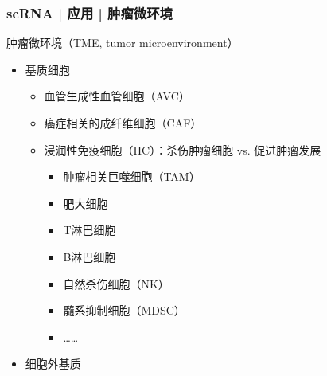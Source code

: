 \documentclass[11pt]{ctexbeamer}
\begin{document}
\begin{frame}
  \frametitle{scRNA | 应用 |  肿瘤微环境}
  \begin{block}{肿瘤微环境（TME, tumor microenvironment）}
  \begin{itemize}
    \item 基质细胞
    \begin{itemize}
      \item 血管生成性血管细胞（AVC）
      \item 癌症相关的成纤维细胞（CAF）
      \item \alert{浸润性免疫细胞（IIC）}：杀伤肿瘤细胞 vs. 促进肿瘤发展
      \begin{itemize}
        \item 肿瘤相关巨噬细胞（TAM）
        \item 肥大细胞
        \item T淋巴细胞
        \item B淋巴细胞
        \item 自然杀伤细胞（NK）
        \item 髓系抑制细胞（MDSC）
        \item ……
      \end{itemize}
    \end{itemize}
    \item 细胞外基质
  \end{itemize}
  \end{block}
\end{frame}
\end{document}
